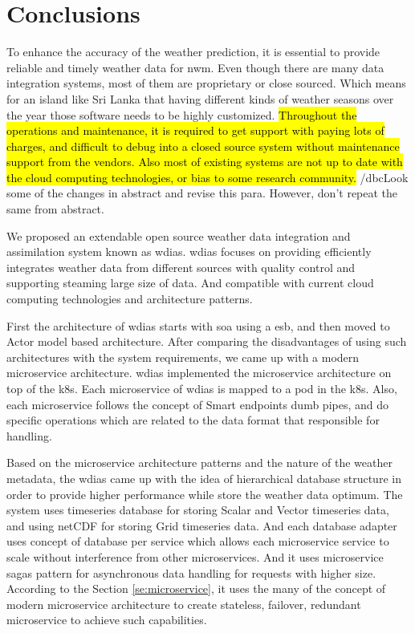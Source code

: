 \section{Conclusions}
\label{se:summary_conclusion}

To enhance the accuracy of the weather prediction, it is essential to provide reliable and timely weather data for \acrshort{nwm}. Even though there are many data integration systems, most of them are proprietary or close sourced. Which means for an island like Sri Lanka that having different kinds of weather seasons over the year those software needs to be highly customized. \hl{Throughout the operations and maintenance, it is required to get support with paying lots of charges, and difficult to debug into a closed source system without maintenance support from the vendors. Also most of existing systems are not up to date with the cloud computing technologies, or bias to some research community.}
/dbc{Look some of the changes in abstract and revise this para. However, don't repeat the same from abstract.}

We proposed an extendable open source weather data integration and assimilation system known as \acrshort{wdias}. \acrshort{wdias} focuses on providing efficiently integrates weather data from different sources with quality control and supporting steaming large size of data. And compatible with current cloud computing technologies and architecture patterns.

First the architecture of \acrshort{wdias} starts with \acrshort{soa} using a \acrfull{esb}, and then moved to Actor model based architecture. After comparing the disadvantages of using such architectures with the system requirements, we came up with a modern microservice architecture.
\acrshort{wdias} implemented the microservice architecture on top of the \acrshort{k8s}. Each microservice of \acrshort{wdias} is mapped to a pod in the \acrshort{k8s}. Also, each microservice follows the concept of Smart endpoints dumb pipes, and do specific operations which are related to the data format that responsible for handling.

Based on the microservice architecture patterns and the nature of the weather metadata, the \acrshort{wdias} came up with the idea of hierarchical database structure in order to provide higher performance while store the weather data optimum. The system uses timeseries database for storing Scalar and Vector timeseries data, and using \acrshort{netCDF} for storing Grid timeseries data. And each database adapter uses concept of database per service which allows each microservice service to scale without interference from other microservices.
And it uses microservice sagas pattern for asynchronous data handling for requests with higher size. According to the Section \ref{se:microservice}, it uses the many of the concept of modern microservice architecture to create stateless, failover, redundant microservice to achieve such capabilities.

